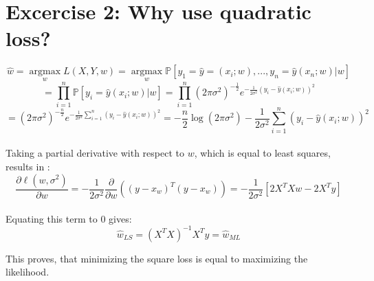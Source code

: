 \documentclass[12pt]{article}
\DeclareMathOperator*{\argmax}{argmax}
\begin{document}
\section*{Excercise 2: Why use quadratic loss?}

$$\hat{w}= \argmax\limits_{w}L(X,Y,w)
=\argmax\limits_{w} \mathbb{P}[y_1=\hat{y}=(x_i;w),...,y_n
=\hat{y} (x_n;w)|w]$$
$$=\prod\limits_{i=1}^{n}\mathbb{P}[y_i=\hat{y}(x_i;w)|w]
=\prod\limits_{i=1}^{n}(2\pi\sigma^2)^{-\frac{1}{2}} e^{-\frac{1}{2\sigma^2}(y_i-\hat{y}(x_i;w))^2}$$
$$=(2\pi\sigma^2)^{-\frac{n}{2}}e^{-\frac{1}{2\sigma^2}\sum\limits_{i=1}^{n}(y_i-\hat{y}(x_i;w))^2}
=-\frac{n}{2}\log(2\pi\sigma^2)-\frac{1}{2\sigma^2}\sum\limits_{i=1}^{n}(y_i-\hat{y}(x_i;w))^2$$\\
Taking a partial derivative with respect to $w$, which is equal to least squares, results in :\\
$$\frac{\partial \ell(w,\sigma^2)}{\partial w}=-\frac{1}{2\sigma^2}\frac{\partial}{\partial w}((y-x_w)^T(y-x_w)) = -\frac{1}{2\sigma^2}[2X^TXw-2X^Ty]$$\\
Equating this term to $0$ gives:\\
$$\hat{w}_{LS}=(X^TX)^{-1}X^Ty=\hat{w}_{ML}$$

This proves, that minimizing the square loss is equal to maximizing the likelihood.
\end{document}

